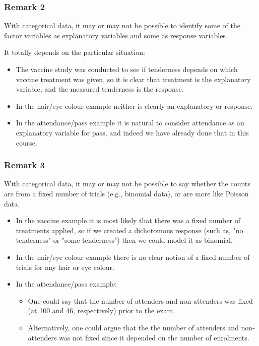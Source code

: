 \documentclass{beamer}\usepackage[]{graphicx}\usepackage[]{xcolor}
\begin{document}
\begin{frame}[fragile]
\frametitle{Remark 2}
With categorical data, it may or may not be possible to identify some of the factor variables as explanatory variables and some as response variables.
\bigskip

It totally depends on the particular situation:

\begin{itemize}
  \item The vaccine study was conducted to see if tenderness depends on which vaccine treatment was given, so it is clear that treatment is the explanatory variable, and the measured tenderness is the response.
  \item In the hair/eye colour example neither is clearly an explanatory or response.
  \item In the attendance/pass example it is natural to consider attendance as an explanatory variable for pass, and indeed we have already done that in this course.
\end{itemize}
\end{frame}



\begin{frame}[fragile]
\frametitle{Remark 3}
With categorical data, it may or may not be possible to say whether the counts are from a fixed number of trials (e.g., binomial data), or are more like Poisson data.
\bigskip

\begin{itemize}
  \item In the vaccine example it is most likely that there was a fixed number of treatments applied, so if we created a dichotomous response (such as, "no tenderness" or "some tenderness") then we could model it as binomial.
  \item In the hair/eye colour example there is no clear notion of a fixed number of trials for any hair or eye colour.
  \item In the attendance/pass example:
  \begin{itemize}
    \item One could say that the number of attenders and non-attenders was fixed (at 100 and 46, respectively) prior to the exam.
    \item Alternatively, one could argue that the the number of attenders and non-attenders was not fixed since it depended on the number of enrolments.
  \end{itemize}
\end{itemize}


\end{frame}
\end{document}
